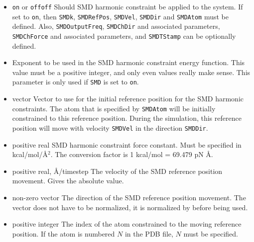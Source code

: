 \begin{itemize}

\item 
{}
{\verb!on! or \verb!off!}{\verb!off!}
{Should SMD harmonic constraint be applied to the system. If set 
to \verb!on!, then  \verb!SMDk!, \verb!SMDRefPos!, \verb!SMDVel!,
\verb!SMDDir! and \verb!SMDAtom! must be defined. Also,
\verb!SMDOutputFreq!, \verb!SMDChDir! and associated parameters,
\verb!SMDChForce! and associated parameters, and \verb!SMDTStamp! can
be optionally defined.}

\item
{}
{Exponent to be used in the SMD harmonic constraint energy function.
This value must be a positive integer, and only even values really make
sense.  This parameter is only used if \verb!SMD! is set to 
\verb!on!.}

\item
{}
{vector} {Vector to use for the initial reference position for the SMD
harmonic constraints. The atom that is specified by \verb!SMDAtom!
will be initially constrained to this reference position. During the
simulation, this reference position will move with velocity
\verb!SMDVel! in the direction \verb!SMDDir!.}

\item
{}
{positive real}
{SMD harmonic constraint force constant. Must be specified in
kcal/mol/\AA$^2$. The conversion factor is 1 kcal/mol = 69.479 pN \AA.} 

\item
{}
{positive real, \AA/timestep}
{The velocity of the SMD reference position movement. Gives the absolute
value.}

\item
{}
{non-zero vector}
{The direction of the SMD reference position movement. The vector does
not have to be normalized, it is normalized by \NAMD before being used.}

\item
{}
{positive integer}
{The index of the atom constrained to the moving reference position. 
If the atom is numbered $N$ in the PDB file, $N$ must be specified.
}


\end{itemize}
